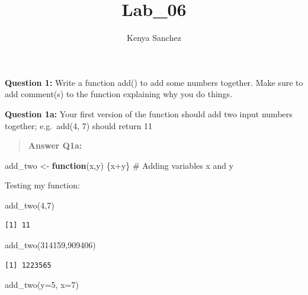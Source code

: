 \documentclass[
  letterpaper,
  DIV=11,
  numbers=noendperiod]{scrartcl}
\title{Lab\_06}
\author{Kenya Sanchez}
\date{}
\newenvironment{Shaded}{\begin{snugshade}}{\end{snugshade}}
\newcommand{\AttributeTok}[1]{\textcolor[rgb]{0.40,0.45,0.13}{#1}}
\newcommand{\CommentTok}[1]{\textcolor[rgb]{0.37,0.37,0.37}{#1}}
\newcommand{\ControlFlowTok}[1]{\textcolor[rgb]{0.00,0.23,0.31}{\textbf{#1}}}
\newcommand{\DecValTok}[1]{\textcolor[rgb]{0.68,0.00,0.00}{#1}}
\newcommand{\FunctionTok}[1]{\textcolor[rgb]{0.28,0.35,0.67}{#1}}
\newcommand{\NormalTok}[1]{\textcolor[rgb]{0.00,0.23,0.31}{#1}}
\newcommand{\OtherTok}[1]{\textcolor[rgb]{0.00,0.23,0.31}{#1}}
\newcommand{\SpecialCharTok}[1]{\textcolor[rgb]{0.37,0.37,0.37}{#1}}
\begin{document}
\maketitle


\textbf{Question 1:} Write a function add() to add some numbers
together. Make sure to add comment(s) to the function explaining why you
do things.

\textbf{Question 1a:} Your first version of the function should add two
input numbers together; e.g.~add(4, 7) should return 11

\begin{quote}
\textbf{Answer Q1a:}
\end{quote}

\begin{Shaded}
\begin{Highlighting}[]
\NormalTok{add\_two }\OtherTok{\textless{}{-}} \ControlFlowTok{function}\NormalTok{(x,y) \{x}\SpecialCharTok{+}\NormalTok{y\}}
\CommentTok{\# Adding variables x and y}
\end{Highlighting}
\end{Shaded}

Testing my function:

\begin{Shaded}
\begin{Highlighting}[]
\FunctionTok{add\_two}\NormalTok{(}\DecValTok{4}\NormalTok{,}\DecValTok{7}\NormalTok{)}
\end{Highlighting}
\end{Shaded}

\begin{verbatim}
[1] 11
\end{verbatim}

\begin{Shaded}
\begin{Highlighting}[]
\FunctionTok{add\_two}\NormalTok{(}\DecValTok{314159}\NormalTok{,}\DecValTok{909406}\NormalTok{)}
\end{Highlighting}
\end{Shaded}

\begin{verbatim}
[1] 1223565
\end{verbatim}

\begin{Shaded}
\begin{Highlighting}[]
\FunctionTok{add\_two}\NormalTok{(}\AttributeTok{y=}\DecValTok{5}\NormalTok{, }\AttributeTok{x=}\DecValTok{7}\NormalTok{)}
\end{Highlighting}
\end{Shaded}
\end{document}
